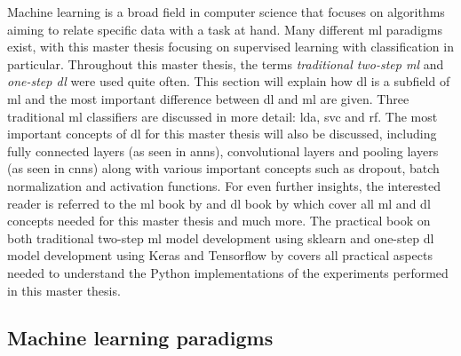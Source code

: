 Machine learning is a broad field in computer science that focuses on algorithms aiming to relate specific data with a task at hand.
Many different \gls{ml} paradigms exist, with this master thesis focusing on supervised learning with classification in particular.
Throughout this master thesis, the terms \textit{traditional two-step \gls{ml}} and \textit{one-step \gls{dl}} were used quite often.
This section will explain how \gls{dl} is a subfield of \gls{ml} and the most important difference between \gls{dl} and \gls{ml} are given.
Three traditional \gls{ml} classifiers are discussed in more detail: \gls{lda}, \gls{svc} and \gls{rf}.
The most important concepts of \gls{dl} for this master thesis will also be discussed, including fully connected layers (as seen in \glspl{ann}), convolutional layers and pooling layers (as seen in \glspl{cnn}) along with various important concepts such as dropout, batch normalization and activation functions.
For even further insights, the interested reader is referred to the \gls{ml} book by \citet{ml_book} and \gls{dl} book by \citet{dl_book} which cover all \gls{ml} and \gls{dl} concepts needed for this master thesis and much more.
The practical book on both traditional two-step \gls{ml} model development using \gls{sklearn} and one-step \gls{dl} model development using Keras and Tensorflow by \citet{ml_dl_book} covers all practical aspects needed to understand the Python implementations of the experiments performed in this master thesis.


\subsection{Machine learning paradigms}
\label{subsec:processing_signals_ml_and_dl_tyes_of_learning_supervision}




